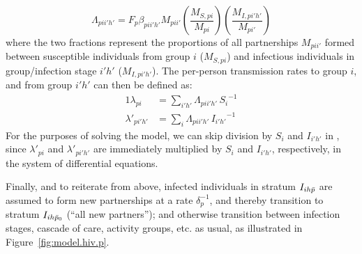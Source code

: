 \begin{equation}
  \Lambda_{pii'h'} = F_p \beta_{pii'h'} M_{pii'}
  \left(\frac{M_{S,pi}}{M_{pi}}\right)
  \left(\frac{M_{I,pi'h'}}{M_{pi'}}\right)
\end{equation}
where the two fractions represent the proportions of all partnerships $M_{pii'}$
formed between susceptible individuals from group $i$ ($M_{S,pi}$)
and infectious individuals in group/infection stage $i'h'$ ($M_{I,pi'h'}$).
The per-person transmission rates to group $i$, and from group $i'h'$ can then be defined as:
\begin{alignat}{1}
  \lambda_{pi} &= \sum_{i'h'} \Lambda_{pii'h'}\,{S_{i}}^{-1} \label{eq:foi.i} \\
  \lambda'_{pi'h'} &= \sum_{i} \Lambda_{pii'h'}\,{I_{i'h'}}^{-1} \label{eq:foi.jh}
\end{alignat}
For the purposes of solving the model,
we can skip division by $S_{i}$ and $I_{i'h'}$ in ,
since $\lambda'_{pi}$ and $\lambda'_{pi'h'}$ are immediately multiplied by $S_{i}$ and $I_{i'h'}$,
respectively, in the system of differential equations.
\par
Finally, and to reiterate from above, infected individuals in stratum $I_{ih\bar{p}}$
are assumed to form new partnerships at a rate $\delta_p^{-1}$,
and thereby transition to stratum $I_{ih\bar{p}_0}$ (``all new partners''); and
otherwise transition between infection stages, cascade of care, activity groups, etc. as usual,
as illustrated in Figure~\ref{fig:model.hiv.p}.
